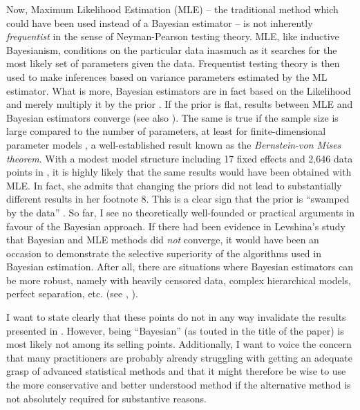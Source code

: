 Now, Maximum Likelihood Estimation (MLE) -- the traditional method which could have been used instead of a Bayesian estimator -- is not inherently \textit{frequentist} in the sense of Neyman-Pearson testing theory.
MLE, like inductive Bayesianism, conditions on the particular data inasmuch as it searches for the most likely set of parameters given the data.
Frequentist testing theory is then used to make inferences based on variance parameters estimated by the ML estimator.
What is more, Bayesian estimators are in fact based on the Likelihood and merely multiply it by the prior \citep[6--8]{GelmanEa2014}.
If the prior is flat, results between MLE and Bayesian estimators converge (see also \citealt[347]{GelmanHill2006}).
The same is true if the sample size is large compared to the number of parameters, at least for finite-dimensional parameter models \citep[1119--1120]{Freedman1999}, a well-established result known as the \textit{Bernstein-von Mises theorem}.
With a modest model structure including 17 fixed effects and 2,646 data points in \citet{Levshina2016}, it is highly likely that the same results would have been obtained with MLE.
In fact, she admits that changing the priors did not lead to substantially different results in her footnote 8.
This is a clear sign that the prior is ``swamped by the data'' \citep[1119]{Freedman1999}.
So far, I see no theoretically well-founded or practical arguments in favour of the Bayesian approach.
If there had been evidence in Levshina's study that Bayesian and MLE methods did \textit{not} converge, it would have been an occasion to demonstrate the selective superiority of the algorithms used in Bayesian estimation.
After all, there are situations where Bayesian estimators can be more robust, namely with heavily censored data, complex hierarchical models, perfect separation, etc. (see \citealt{Freedman1999}, \citealt[345--348]{GelmanHill2006}).

I want to state clearly that these points do not in any way invalidate the results presented in \citet{Levshina2016}.
However, being ``Bayesian'' (as touted in the title of the paper) is most likely not among its selling points.
Additionally, I want to voice the concern that many practitioners are probably already struggling with getting an adequate grasp of advanced statistical methods and that it might therefore be wise to use the more conservative and better understood method if the alternative method is not absolutely required for substantive reasons.

